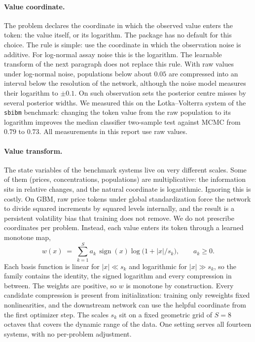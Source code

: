 \documentclass[10pt]{article}
\begin{document}
\paragraph{Value coordinate.} The problem declares the coordinate in which the observed value enters
the token: the value itself, or its logarithm. The package has no default for this choice. The rule is
simple: use the coordinate in which the observation noise is additive. For log-normal assay noise this
is the logarithm. The learnable transform of the next paragraph does not replace this rule. With raw
values under log-normal noise, populations below about $0.05$ are compressed into an interval below
the resolution of the network, although the noise model measures their logarithm to $\pm 0.1$. On such
observation sets the posterior centre misses by several posterior widths. We measured this on the
Lotka--Volterra system of the \texttt{sbibm} benchmark: changing the token value from the raw
population to its logarithm improves the median classifier two-sample test against MCMC from $0.79$
to $0.73$. All measurements in this report use raw values.

\paragraph{Value transform.} The state variables of the benchmark systems live on very different
scales. Some of them (prices, concentrations, populations) are multiplicative: the information sits in
relative changes, and the natural coordinate is logarithmic. Ignoring this is costly. On GBM, raw
price tokens under global standardization force the network to divide squared increments by squared
levels internally, and the result is a persistent volatility bias that training does not remove. We
do not prescribe coordinates per problem. Instead, each value enters its token through a learned
monotone map,
\begin{equation}
  w(x) \;=\; \sum_{k=1}^{S} a_k \,\operatorname{sign}(x) \log\!\bigl(1 + |x| / s_k\bigr),
  \qquad a_k \ge 0.
  \label{eq:warp}
\end{equation}
Each basis function is linear for $|x| \ll s_k$ and logarithmic for $|x| \gg s_k$, so the family
contains the identity, the signed logarithm and every compression in between. The weights are
positive, so $w$ is monotone by construction. Every candidate compression is present from
initialization: training only reweights fixed nonlinearities, and the downstream network can use the
helpful coordinate from the first optimizer step. The scales $s_k$ sit on a fixed geometric grid of
$S = 8$ octaves that covers the dynamic range of the data. One setting serves all fourteen systems,
with no per-problem adjustment.
\end{document}
